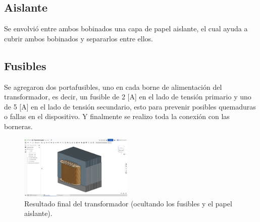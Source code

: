 \subsection{Aislante}
Se envolvió entre ambos bobinados una capa de papel aislante, el cual ayuda a cubrir ambos bobinados y separarlos entre ellos.

\subsection{Fusibles}
Se agregaron dos portafusibles, uno en cada borne de alimentación del transformador, es decir, un fusible de 2 [A] en el lado de tensión primario y uno de 5 [A] en el lado de tensión secundario, esto para prevenir posibles quemaduras o fallas en el dispositivo. Y finalmente se realizo toda la conexión con las borneras.



\begin{figure}[ht!]
    \centering
    \includegraphics[width=0.48\textwidth]{fot/T3.png}
    \caption{Resultado final del transformador (ocultando los fusibles y el papel aislante).}
    \label{fig:T3}
\end{figure}

